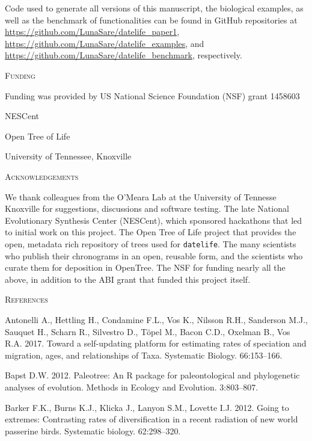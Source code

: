 \documentclass[]{article}
\begin{document}
Code used to generate all versions of this manuscript, the biological examples, as well as the benchmark of functionalities can be found in GitHub repositories at \url{https://github.com/LunaSare/datelife_paper1}, \url{https://github.com/LunaSare/datelife_examples}, and \url{https://github.com/LunaSare/datelife_benchmark}, respectively.

\begin{center}
\textsc{Funding}
\end{center}

Funding was provided by US National Science Foundation (NSF) grant 1458603

NESCent

Open Tree of Life

University of Tennessee, Knoxville

\begin{center}
\textsc{Acknowledgements}
\end{center}

We thank colleagues from the O'Meara Lab at the University
of Tennesse Knoxville for suggestions, discussions and software testing.
The late National Evolutionary Synthesis Center (NESCent), which sponsored hackathons
that led to initial work on this project.
The Open Tree of Life project that provides the open, metadata rich repository of
trees used for \texttt{datelife}.
The many scientists who publish their chronograms in an open, reusable form, and
the scientists who curate them for deposition in OpenTree.
The NSF for funding nearly all the above, in addition
to the ABI grant that funded this project itself.

\newpage

\begin{center}
\textsc{References}
\end{center}

\hypertarget{refs}{}
\leavevmode\hypertarget{ref-antonelli2017supersmart}{}%
Antonelli A., Hettling H., Condamine F.L., Vos K., Nilsson R.H., Sanderson M.J., Sauquet H., Scharn R., Silvestro D., Töpel M., Bacon C.D., Oxelman B., Vos R.A. 2017. Toward a self-updating platform for estimating rates of speciation and migration, ages, and relationships of Taxa. Systematic Biology. 66:153--166.

\leavevmode\hypertarget{ref-Bapst2012a}{}%
Bapst D.W. 2012. Paleotree: An R package for paleontological and phylogenetic analyses of evolution. Methods in Ecology and Evolution. 3:803--807.

\leavevmode\hypertarget{ref-barker2012going}{}%
Barker F.K., Burns K.J., Klicka J., Lanyon S.M., Lovette I.J. 2012. Going to extremes: Contrasting rates of diversification in a recent radiation of new world passerine birds. Systematic biology. 62:298--320.
\end{document}
